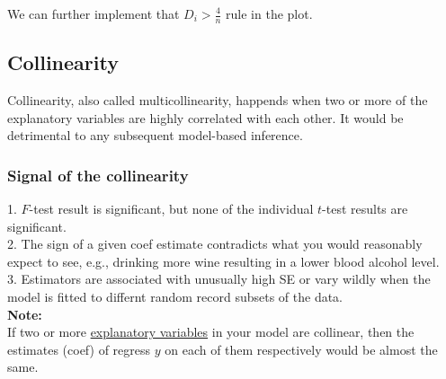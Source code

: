 \documentclass[12pt]{article}
\begin{document}
We can further implement that $ D_{i} > \frac{4}{n} $ rule in the plot.

\begin{figure}[H]
\end{figure}





\subsection{Collinearity}

Collinearity, also called multicollinearity, happends when two or
more of the explanatory variables are highly correlated with each 
other. It would be detrimental to any subsequent model-based 
inference.

\subsubsection{Signal of the collinearity}
1. $ F $-test result is significant, but none of the individual
$ t $-test results are significant.\\

2. The sign of a given coef estimate contradicts what you would 
reasonably expect to see, e.g., drinking more wine resulting in a 
lower blood alcohol level.\\

3. Estimators are associated with unusually high SE or vary wildly when
the model is fitted to differnt random record subsets of the data.\\



{\textbf {Note:}}\\

If two or more {\underline {explanatory variables}} in your model
are collinear, then the estimates (coef) of regress $ y $ on each of
them respectively would be almost the same.
\end{document}
